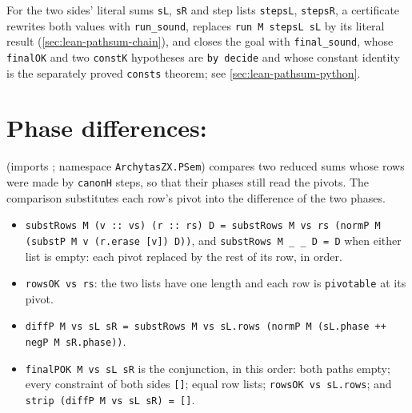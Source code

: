 \begin{example}
For the two sides' literal sums \textnormal{\texttt{sL}}, \textnormal{\texttt{sR}} and step lists \textnormal{\texttt{stepsL}},
\textnormal{\texttt{stepsR}}, a certificate rewrites both values with \textnormal{\texttt{run\_\allowbreak{}sound}}, replaces
\textnormal{\texttt{run M stepsL sL}} by its literal result (\cref{sec:lean-pathsum-chain}), and closes the goal
with \textnormal{\texttt{final\_\allowbreak{}sound}}, whose \textnormal{\texttt{finalOK}} and two \textnormal{\texttt{constK}} hypotheses are \textnormal{\texttt{by decide}}
and whose constant identity is the separately proved \textnormal{\texttt{consts}} theorem; see
\cref{sec:lean-pathsum-python}.
\end{example}

\section{Phase differences: \texorpdfstring{}{PathSumParity}}\label{sec:lean-pathsum-parity}

 (imports ; namespace \textnormal{\texttt{ArchytasZX.PSem}}) compares two
reduced sums whose rows were made by \textnormal{\texttt{canonH}} steps, so that their phases still read the
pivots. The comparison substitutes each row's pivot into the difference of the two phases.

\begin{definition}\label{def:lean-pathsum-diffp}
\begin{itemize}
\item \textnormal{\texttt{substRows M (v :: vs) (r :: rs) D = substRows M vs rs (normP M (substP M v (r.erase [v]) D))}},
  and \textnormal{\texttt{substRows M \_ \_ D = D}} when either list is empty: each pivot replaced by the rest of
  its row, in order.
\item \textnormal{\texttt{rowsOK vs rs}}: the two lists have one length and each row is \textnormal{\texttt{pivotable}} at its
  pivot.
\item \textnormal{\texttt{diffP M vs sL sR = substRows M vs sL.rows (normP M (sL.phase ++ negP M sR.phase))}}.
\item \textnormal{\texttt{finalPOK M vs sL sR}} is the conjunction, in this order: both paths empty; every
  constraint of both sides \textnormal{\texttt{[]}}; equal row lists; \textnormal{\texttt{rowsOK vs sL.rows}}; and
  \textnormal{\texttt{strip (diffP M vs sL sR) = []}}.
\end{itemize}
\end{definition}

